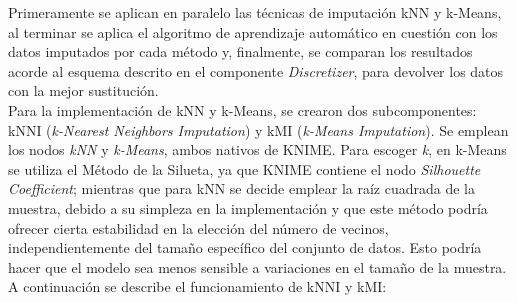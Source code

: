 Primeramente se aplican en paralelo las técnicas de imputación kNN y k-Means, al terminar se aplica el algoritmo de aprendizaje automático en cuestión con los datos imputados por cada método y, finalmente, se comparan los resultados acorde al esquema descrito en el componente \textit{Discretizer}, para devolver los datos con la mejor sustitución. \\
Para la implementación de kNN y k-Means, se crearon dos subcomponentes: kNNI (\textit{k-Nearest Neighbors Imputation}) y kMI (\textit{k-Means Imputation}). Se emplean los nodos \textit{kNN} y \textit{k-Means}, ambos nativos de KNIME. Para escoger \textit{k}, en k-Means se utiliza el Método de la Silueta, ya que KNIME contiene el nodo \textit{Silhouette Coefficient}; mientras que para kNN se decide emplear la raíz cuadrada de la muestra, debido a su simpleza en la implementación y que este método podría ofrecer cierta estabilidad en la elección del número de vecinos, independientemente del tamaño específico del conjunto de datos. Esto podría hacer que el modelo sea menos sensible a variaciones en el tamaño de la muestra. A continuación se describe el funcionamiento de kNNI y kMI:

